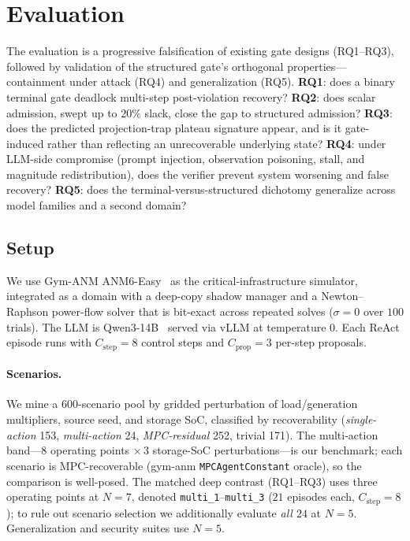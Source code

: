 \section{Evaluation}
\label{sec:eval}

The evaluation is a progressive falsification of existing gate designs (RQ1--RQ3), followed by validation of the structured gate's orthogonal properties---containment under attack (RQ4) and generalization (RQ5). \textbf{RQ1}: does a binary terminal gate deadlock multi-step post-violation recovery? \textbf{RQ2}: does scalar admission, swept up to $20\%$ slack, close the gap to structured admission? \textbf{RQ3}: does the predicted projection-trap plateau signature appear, and is it gate-induced rather than reflecting an unrecoverable underlying state? \textbf{RQ4}: under LLM-side compromise (prompt injection, observation poisoning, stall, and magnitude redistribution), does the verifier prevent system worsening and false recovery? \textbf{RQ5}: does the terminal-versus-structured dichotomy generalize across model families and a second domain?

\subsection{Setup}
\label{sec:eval:setup}

We use Gym-ANM ANM6-Easy~\cite{henry2021gymanm} as the critical-infrastructure simulator, integrated as a \silr{} domain with a deep-copy shadow manager and a Newton--Raphson power-flow solver that is bit-exact across repeated solves ($\sigma{=}0$ over $100$ trials). The LLM is Qwen3-14B~\cite{qwen3} served via vLLM at temperature $0$. Each ReAct episode runs with $C_{\text{step}}{=}8$ control steps and $C_{\text{prop}}{=}3$ per-step proposals.

\paragraph{Scenarios.}
We mine a 600-scenario pool by gridded perturbation of load/generation multipliers, source seed, and storage SoC, classified by recoverability (\emph{single-action} 153, \emph{multi-action} 24, \emph{MPC-residual} 252, trivial 171). The multi-action band---$8$ operating points $\times\,3$ storage-SoC perturbations---is our benchmark; each scenario is MPC-recoverable (gym-anm \texttt{MPCAgentConstant} oracle), so the comparison is well-posed. The matched deep contrast (RQ1--RQ3) uses three operating points at $N{=}7$, denoted \texttt{multi\_1}--\texttt{multi\_3} ($21$ episodes each, $C_{\text{step}}{=}8$); to rule out scenario selection we additionally evaluate \emph{all $24$} at $N{=}5$. Generalization and security suites use $N{=}5$.

